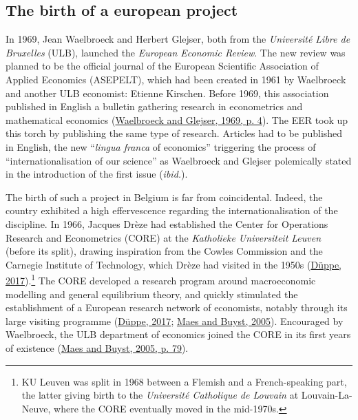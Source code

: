 \documentclass[
  12pt,
  onecolumn]{article}
\begin{document}
\hypertarget{the-birth-of-a-european-project}{%
\subsection{The birth of a european
project}\label{the-birth-of-a-european-project}}

In 1969, Jean Waelbroeck and Herbert Glejser, both from the
\emph{Université Libre de Bruxelles} (ULB), launched the \emph{European
Economic Review}. The new review was planned to be the official journal
of the European Scientific Association of Applied Economics (ASEPELT),
which had been created in 1961 by Waelbroeck and another ULB economist:
Etienne Kirschen. Before 1969, this association published in English a
bulletin gathering research in econometrics and mathematical economics
(\protect\hyperlink{ref-waelbroeck1969}{Waelbroeck and Glejser, 1969, p.
4}). The EER took up this torch by publishing the same type of research.
Articles had to be published in English, the new ``\emph{lingua franca}
of economics'' triggering the process of ``internationalisation of our
science'' as Waelbroeck and Glejser polemically stated in the
introduction of the first issue (\emph{ibid.}).

The birth of such a project in Belgium is far from coincidental. Indeed,
the country exhibited a high effervescence regarding the
internationalisation of the discipline. In 1966, Jacques Drèze had
established the Center for Operations Research and Econometrics (CORE)
at the \emph{Katholieke Universiteit Leuven} (before its split), drawing
inspiration from the Cowles Commission and the Carnegie Institute of
Technology, which Drèze had visited in the 1950s
(\protect\hyperlink{ref-duppe2017}{Düppe, 2017}).\footnote{KU Leuven was
  split in 1968 between a Flemish and a French-speaking part, the latter
  giving birth to the \emph{Université Catholique de Louvain} at
  Louvain-La-Neuve, where the CORE eventually moved in the mid-1970s.}
The CORE developed a research program around macroeconomic modelling and
general equilibrium theory, and quickly stimulated the establishment of
a European research network of economists, notably through its large
visiting programme (\protect\hyperlink{ref-duppe2017}{Düppe, 2017};
\protect\hyperlink{ref-maes2005}{Maes and Buyst, 2005}). Encouraged by
Waelbroeck, the ULB department of economics joined the CORE in its first
years of existence (\protect\hyperlink{ref-maes2005}{Maes and Buyst,
2005, p. 79}).
\end{document}
